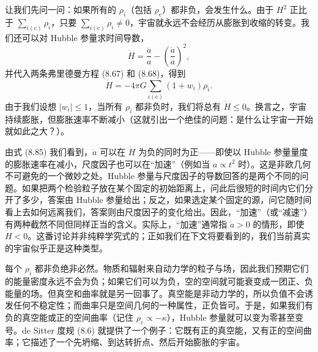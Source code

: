 让我们先问一问：如果所有的 $\rho_i$（包括 $\rho_{\mathrm{c}}$）都非负，会发生什么。由于 $H^{2}$ 正比于 $\sum_{i(\mathrm{c})}\rho_i$，只要 $\sum_{i(\mathrm{c})}\rho_i\neq0$，宇宙就永远不会经历从膨胀到收缩的转变。我们还可以对 Hubble 参量求时间导数，
\begin{equation*}
\dot{H} = \frac{\ddot{a}}{a} - \left(\frac{\dot{a}}{a}\right)^{2},
\tag{8.85}
\end{equation*}
并代入两条弗里德曼方程 (8.67) 和 (8.68)，得到
\begin{equation*}
\dot{H} = -4\pi G\sum_{i(\mathrm{c})}(1+w_i)\rho_i.
\tag{8.86}
\end{equation*}
由于我们设想 $|w_i|\le1$，当所有 $\rho_i$ 都非负时，我们将总有 $\dot{H}\le0$。换言之，宇宙持续膨胀，但膨胀速率不断减小（这就引出一个绝佳的问题：是什么让宇宙一开始就如此之大？）。

由式 (8.85) 我们看到，$\ddot{a}$ 可以在 $\dot{H}$ 为负的同时为正——即使以 Hubble 参量量度的膨胀速率在减小，尺度因子也可以在“加速”（例如当 $a\propto t^{2}$ 时）。这是非欧几何不可避免的一个微妙之处。Hubble 参量与尺度因子的导数回答的是两个不同的问题。如果把两个检验粒子放在某个固定的初始距离上，问此后很短的时间内它们分开了多少，答案由 Hubble 参量给出；反之，如果选定某个固定的源，问它随时间看上去如何远离我们，答案则由尺度因子的变化给出。因此，“加速”（或“减速”）有两种截然不同但同样正当的含义。实际上，“加速”通常指 $\ddot{a}>0$ 的情形，即使 $\dot{H}<0$。这番讨论并非纯粹学究式的；正如我们在下文将要看到的，我们当前真实的宇宙似乎正是这种类型。

每个 $\rho_i$ 都非负绝非必然。物质和辐射来自动力学的粒子与场，因此我们预期它们的能量密度永远不会为负；如果它们可以为负，空的空间就可能衰变成一团正、负能量的场。但真空和曲率就是另一回事了。真空能是非动力学的，所以负值不会诱发任何不稳定性；而曲率只是空间几何的一种属性，正负皆可。于是，如果我们有
负的真空能或正的空间曲率（记住 $\rho_{\mathrm{c}}\propto-\kappa$），Hubble 参量就可以变为零甚至变号。de Sitter 度规 (8.6) 就提供了一个例子：它既有正的真空能，又有正的空间曲率；它描述了一个先坍缩、到达转折点、然后开始膨胀的宇宙。


